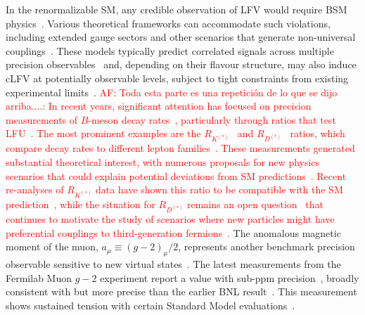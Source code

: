 In the renormalizable SM, any credible observation of LFV  would require BSM physics~\cite{Hiller:2014yaa,Dorsner:2016wpm}. Various theoretical frameworks can accommodate such violations, including extended gauge sectors and other scenarios that generate non-universal couplings~\cite{DiLuzio:2017vat,Greljo:2018tuh,Angelescu:2021lln}. These models typically predict correlated signals across multiple precision observables~\cite{Greljo:2022jac,Ciuchini:2022wbq,Allwicher:2022gkm} and, depending on their flavour structure, may also induce cLFV at potentially observable levels, subject to tight constraints from existing experimental limits~\parencite{Blankenburg:2012nx,Angelescu:2018tyl}.
\textcolor{red}{AF: Toda esta parte es una repetición de lo que se dijo arriba....:
In recent years, significant attention has focused on precision measurements of $B$-meson decay rates~\cite{Hiller:2014yaa,Buttazzo:2017ixm}, particularly through ratios that test LFU~\cite{Amhis_2021}. The most prominent examples are the $R_{K^{(*)}}$~\parencite{LHCb:2014vgu,LHCb:2017avl,LHCb:2019hip,LHCb:2021trn} and $R_{D^{(*)}}$~\parencite{BaBar:2012obs,BaBar:2013mob,Abdesselam:2019dgh,Hirose:2017dxl,Sato:2016svk,Hirose:2016wfn,Huschle:2015rga,LHCb:2015gmp,Aaij:2015yra,Aaij:2017uff,LHCb:2017rln,LHCb:2023zxo} ratios, which compare decay rates to different lepton families~\cite{Amhis_2021,1674-1137-40-10-100001}. These measurements generated substantial theoretical interest, with numerous proposals for new physics scenarios that could explain potential deviations from SM predictions~\cite{Dorsner:2016wpm,Angelescu:2018tyl,Bauer:2015knc,Crivellin:2017zlb}.}
\textcolor{red}{
Recent re-analyses of $R_{K^{(*)}}$ data have shown this ratio to be compatible with the SM prediction~\parencite{LHCb:2022qnv,LHCb:2022zom,Greljo:2022jac,Ciuchini:2022wbq}, while the situation for $R_{D^{(*)}}$ remains an open question~\cite{Amhis_2021} that continues to motivate the study of scenarios where new particles might have preferential couplings to third-generation fermions~\cite{Greljo:2018tuh,King:2021jeo,Cornella:2019hct}.
}
The anomalous magnetic moment of the muon, $a_\mu \equiv (g-2)_\mu/2$, represents another benchmark precision observable sensitive to new virtual states~\cite{Aoyama:2020ynm}. The latest measurements from the Fermilab Muon $g-2$ experiment report a value with sub-ppm precision~\parencite{Abi_2021}, broadly consistent with but more precise than the earlier BNL result~\cite{Muong-2:2006rrc}. This measurement shows sustained tension with certain Standard Model evaluations~\cite{Aoyama:2020ynm}.

